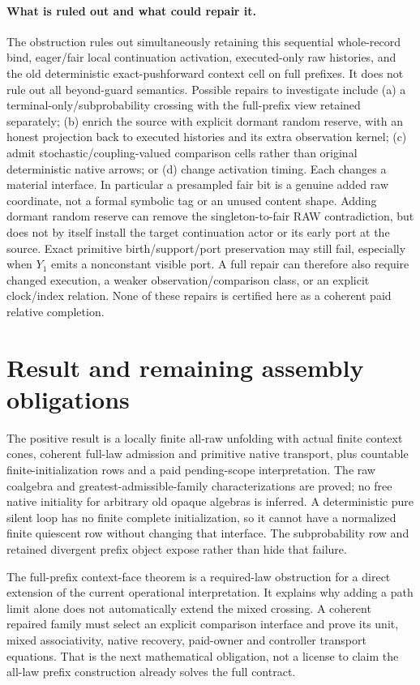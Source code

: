 \documentclass[11pt]{article}
\begin{document}
\paragraph{What is ruled out and what could repair it.}
The obstruction rules out simultaneously retaining this sequential whole-record bind, eager/fair local continuation activation, executed-only raw histories, and the old deterministic exact-pushforward context cell on full prefixes. It does not rule out all beyond-guard semantics. Possible repairs to investigate include (a) a terminal-only/subprobability crossing with the full-prefix view retained separately; (b) enrich the source with explicit dormant random reserve, with an honest projection back to executed histories and its extra observation kernel; (c) admit stochastic/coupling-valued comparison cells rather than original deterministic native arrows; or (d) change activation timing. Each changes a material interface. In particular a presampled fair bit is a genuine added raw coordinate, not a formal symbolic tag or an unused content shape. Adding dormant random reserve can remove the singleton-to-fair RAW contradiction, but does not by itself install the target continuation actor or its early port at the source. Exact primitive birth/support/port preservation may still fail, especially when $Y_1$ emits a nonconstant visible port. A full repair can therefore also require changed execution, a weaker observation/comparison class, or an explicit clock/index relation. None of these repairs is certified here as a coherent paid relative completion.

\section{Result and remaining assembly obligations}
The positive result is a locally finite all-raw unfolding with actual finite context cones, coherent full-law admission and primitive native transport, plus countable finite-initialization rows and a paid pending-scope interpretation. The raw coalgebra and greatest-admissible-family characterizations are proved; no free native initiality for arbitrary old opaque algebras is inferred. A deterministic pure silent loop has no finite complete initialization, so it cannot have a normalized finite quiescent row without changing that interface. The subprobability row and retained divergent prefix object expose rather than hide that failure.

The full-prefix context-face theorem is a required-law obstruction for a direct extension of the current operational interpretation. It explains why adding a path limit alone does not automatically extend the mixed crossing. A coherent repaired family must select an explicit comparison interface and prove its unit, mixed associativity, native recovery, paid-owner and controller transport equations. That is the next mathematical obligation, not a license to claim the all-law prefix construction already solves the full contract.
\end{document}
